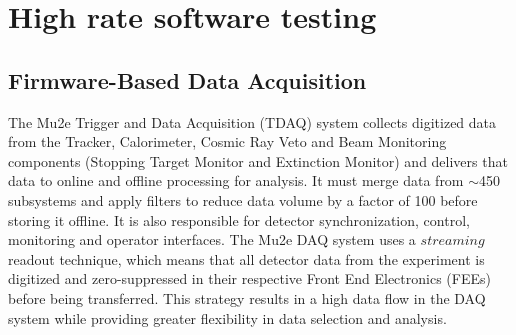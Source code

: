 \chapter{High rate software testing}
\section{Firmware-Based Data Acquisition}
The Mu2e Trigger and Data Acquisition (TDAQ) system collects digitized data from the Tracker, Calorimeter, Cosmic Ray Veto and Beam Monitoring components (Stopping Target Monitor and Extinction Monitor) and delivers that data to online and offline processing for analysis. It must merge data from $\sim$450 subsystems and apply filters to reduce data volume by a factor of 100 before storing it offline. It is also responsible for detector synchronization, control, monitoring and operator interfaces. The Mu2e DAQ system uses a $streaming$ readout technique, which means that all detector data from the experiment is digitized and zero-suppressed in their respective Front End Electronics (FEEs) before being transferred. This strategy results in a high data flow in the DAQ system while providing greater flexibility in data selection and analysis.
